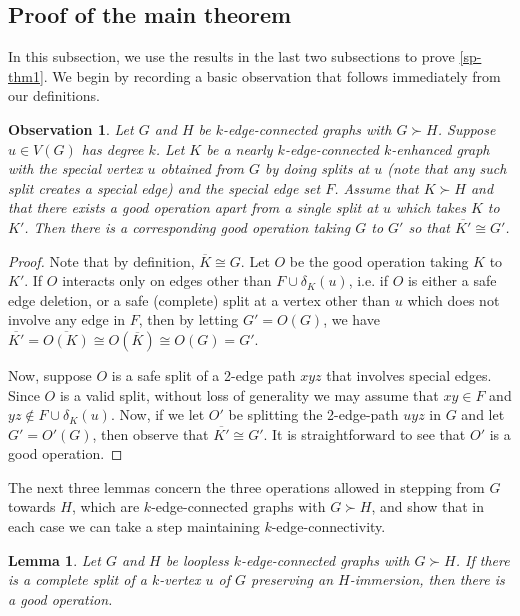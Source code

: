 \documentclass[letterpaper,11pt]{article}
\newtheorem{lemma}[theorem]{Lemma}
\newtheorem{observation}[theorem]{Observation}
\theoremstyle{definition}
\begin{document}
\subsection{Proof of the main theorem}
\label{sec-pf}



In this subsection, we use the results in the last two subsections to prove \cref{sp-thm1}.  We begin by recording a basic observation that follows immediately from our definitions.

\begin{observation}
\label{sew}
Let $G$ and $H$ be $k$-edge-connected graphs with $G \succ H$. Suppose $u \in V(G)$ has degree $k$. Let $K$ be a nearly $k$-edge-connected $k$-enhanced graph with the special vertex $u$ obtained from $G$ by doing splits at $u$ (note that any such split creates a special edge) and the special edge set $F$. Assume that $K \succ H$ and that there exists a good operation apart from a single split at $u$ which takes $K$ to $K'$.  Then there is a corresponding good operation taking $G$ to $G'$ so that $\overline{K'} \cong G'$. 
\end{observation}


\begin{proof}
	Note that by definition, $\overline{K} \cong G$. Let $O$ be the good operation taking $K$ to $K'$. If $O$ interacts only on edges other than $F \cup \delta_K(u)$, i.e. if $O$ is either a safe edge deletion, or a safe (complete) split at a vertex other than $u$ which does not involve any edge in $F$, then by letting $G' = O(G)$, we have $\overline{K'} = \overline{O(K)}  \cong O(\overline{K}) \cong O(G) = G'$.
	
	Now, suppose $O$ is a safe split of a 2-edge path $xyz$ that involves special edges. Since $O$ is a valid split, without loss of generality we may assume that $xy \in F$ and $yz \notin F \cup \delta_K(u)$. Now, if we let $O'$ be splitting the 2-edge-path $uyz$ in $G$ and let $G' = O'(G)$, then observe that $\overline{K'} \cong G'$. It is straightforward to see that $O'$ is a good operation.
\end{proof}

The next three lemmas concern the three operations allowed in stepping from $G$ towards $H$, which are $k$-edge-connected graphs with $G\succ  H$, and show that in each case we can take a step maintaining $k$-edge-connectivity.


\begin{lemma}
\label{lem6}
Let $G$ and $H$ be loopless $k$-edge-connected graphs with $G\succ  H$. If there is a complete split of a $k$-vertex $u$ of $G$ preserving an $H$-immersion, then there is a good operation.
\end{lemma}
\end{document}
